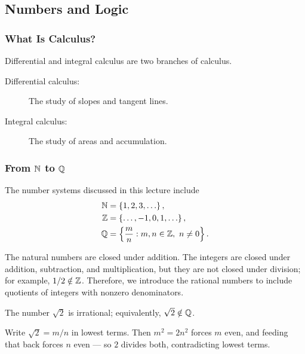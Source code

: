 
\subsection{Numbers and Logic}

\subsubsection{What Is Calculus?}
Differential and integral calculus are two branches of calculus.

\begin{description}
    \item[Differential calculus:] The study of slopes and tangent lines.
    \item[Integral calculus:] The study of areas and accumulation.
\end{description}

\subsubsection{From \texorpdfstring{$\mathbb{N}$ to $\mathbb{Q}$}{N to Q}}
The number systems discussed in this lecture include
\begin{align*}
    \mathbb{N} &= \left\{1,2,3,\ldots\right\}, \\
    \mathbb{Z} &= \left\{\ldots,-1,0,1,\ldots\right\}, \\
    \mathbb{Q} &= \left\{\frac{m}{n} : m,n\in\mathbb{Z},\ n\ne 0\right\}.
\end{align*}

The natural numbers are closed under addition. The integers are closed under addition, subtraction, and multiplication, but they are not closed under division; for example, $1/2\notin\mathbb{Z}$. Therefore, we introduce the rational numbers to include quotients of integers with nonzero denominators.

\begin{theorem}\label{thm:sqrt2-irrational}
    The number $\sqrt{2}$ is irrational; equivalently, $\sqrt{2}\notin\mathbb{Q}$.
\end{theorem}

\begin{idea}
    Write $\sqrt2=m/n$ in lowest terms. Then $m^2=2n^2$ forces $m$ even, and feeding that back forces $n$ even --- so $2$ divides both, contradicting lowest terms.
\end{idea}

